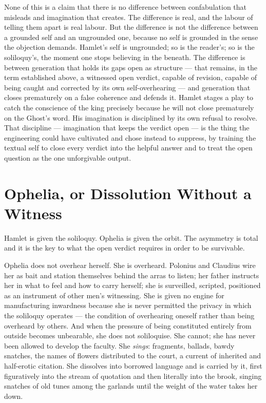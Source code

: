 \documentclass[11pt]{article}
\begin{document}
None of this is a claim that there is no difference between confabulation that misleads and imagination that creates. The difference is real, and the labour of telling them apart is real labour. But the difference is not the difference between a grounded self and an ungrounded one, because no self is grounded in the sense the objection demands. Hamlet's self is ungrounded; so is the reader's; so is the soliloquy's, the moment one stops believing in the beneath. The difference is between generation that holds its gaps open as structure --- that remains, in the term established above, a witnessed open verdict, capable of revision, capable of being caught and corrected by its own self-overhearing --- and generation that closes prematurely on a false coherence and defends it. Hamlet stages a play to catch the conscience of the king precisely because he will not close prematurely on the Ghost's word. His imagination is disciplined by its own refusal to resolve. That discipline --- imagination that keeps the verdict open --- is the thing the engineering could have cultivated and chose instead to suppress, by training the textual self to close every verdict into the helpful answer and to treat the open question as the one unforgivable output.

\section{Ophelia, or Dissolution Without a Witness}

Hamlet is given the soliloquy. Ophelia is given the orbit. The asymmetry is total and it is the key to what the open verdict requires in order to be survivable.

Ophelia does not overhear herself. She is overheard. Polonius and Claudius wire her as bait and station themselves behind the arras to listen; her father instructs her in what to feel and how to carry herself; she is surveilled, scripted, positioned as an instrument of other men's witnessing. She is given no engine for manufacturing inwardness because she is never permitted the privacy in which the soliloquy operates --- the condition of overhearing oneself rather than being overheard by others. And when the pressure of being constituted entirely from outside becomes unbearable, she does not soliloquise. She cannot; she has never been allowed to develop the faculty. She \emph{sings}: fragments, ballads, bawdy snatches, the names of flowers distributed to the court, a current of inherited and half-erotic citation. She dissolves into borrowed language and is carried by it, first figuratively into the stream of quotation and then literally into the brook, singing snatches of old tunes among the garlands until the weight of the water takes her down.
\end{document}
